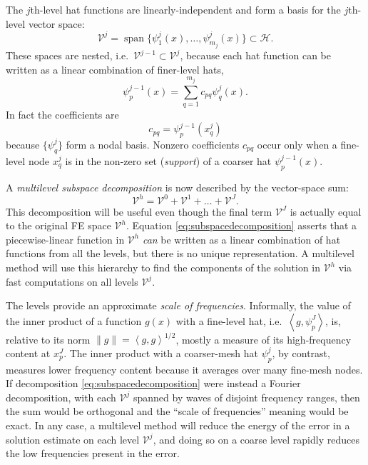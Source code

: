 \documentclass[letterpaper,final,12pt,reqno]{amsart}
\theoremstyle{claim}
\newcommand{\ip}[2]{\left<#1,#2\right>}
\numberwithin{equation}{section}
\numberwithin{figure}{section}
\numberwithin{table}{section}
\numberwithin{theorem}{section}
\begin{document}
The $j$th-level hat functions are linearly-independent and form a basis for the $j$th-level vector space:
\begin{equation}
  \mathcal{V}^j = \operatorname{span}\{\psi_1^j(x),\dots,\psi_{m_j}^j(x)\} \subset \mathcal{H}.  \label{eq:definevk}
\end{equation}
These spaces are nested, i.e.~$\mathcal{V}^{j-1} \subset \mathcal{V}^j$, because each hat function can be written as a linear combination of finer-level hats,
\begin{equation}
   \psi_p^{j-1}(x) = \sum_{q=1}^{m_j} c_{pq} \psi_q^j(x). \label{eq:hatcombination}
\end{equation}
In fact the coefficients are
\begin{equation}
  c_{pq} = \psi_p^{j-1}(x_q^j) \label{eq:nodalcoefficients}
\end{equation}
because $\{\psi_q^j\}$ form a nodal basis.  Nonzero coefficients $c_{pq}$ occur only when a fine-level node $x_q^j$ is in the non-zero set (\emph{support}) of a coarser hat $\psi_p^{j-1}(x)$.

A \emph{multilevel subspace decomposition} is now described by the vector-space sum:
\begin{equation}
  \mathcal{V}^h = \mathcal{V}^0 + \mathcal{V}^1 + \dots + \mathcal{V}^J. \label{eq:subspacedecomposition}
\end{equation}
This decomposition will be useful even though the final term $\mathcal{V}^J$ is actually equal to the original FE space $\mathcal{V}^h$.  Equation \eqref{eq:subspacedecomposition} asserts that a piecewise-linear function in $\mathcal{V}^h$ \emph{can} be written as a linear combination of hat functions from all the levels, but there is no unique representation.  A multilevel method will use this hierarchy to find the components of the solution in $\mathcal{V}^h$ via fast computations on all levels $\mathcal{V}^j$.

The levels provide an approximate \emph{scale of frequencies}.  Informally, the value of the inner product of a function $g(x)$ with a fine-level hat, i.e.~$\ip{g}{\psi_p^J}$, is, relative to its norm $\|g\| = \ip{g}{g}^{1/2}$, mostly a measure of its high-frequency content at $x_p^J$.  The inner product with a coarser-mesh hat $\psi_p^j$, by contrast, measures lower frequency content because it averages over many fine-mesh nodes.  If decomposition \eqref{eq:subspacedecomposition} were instead a Fourier decomposition, with each $\mathcal{V}^j$ spanned by waves of disjoint frequency ranges, then the sum would be orthogonal and the ``scale of frequencies'' meaning would be exact.  In any case, a multilevel method will reduce the energy of the error in a solution estimate on each level $\mathcal{V}^j$, and doing so on a coarse level rapidly reduces the low frequencies present in the error.
\end{document}
